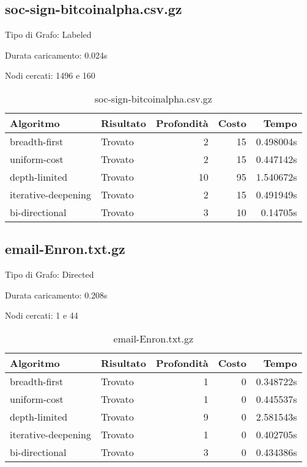 \subsection{soc-sign-bitcoinalpha.csv.gz}
Tipo di Grafo: Labeled

Durata caricamento: 0.024s

Nodi cercati: 1496 e 160

\begin{table}[h]
	\centering
	\begin{tabular}{|l|l|r|r|r|}
		\hline
		\textbf{Algoritmo}  & \textbf{Risultato} & \textbf{Profondità} & \textbf{Costo} & \textbf{Tempo} \\
		\hline
		breadth-first       & Trovato            & 2                   & 15             & 0.498004s      \\
		uniform-cost        & Trovato            & 2                   & 15             & 0.447142s      \\
		depth-limited       & Trovato            & 10                  & 95             & 1.540672s      \\
		iterative-deepening & Trovato            & 2                   & 15             & 0.491949s      \\
		bi-directional      & Trovato            & 3                   & 10             & 0.14705s       \\
		\hline
	\end{tabular}
	\caption{soc-sign-bitcoinalpha.csv.gz}
\end{table}
\subsection{email-Enron.txt.gz}
Tipo di Grafo: Directed

Durata caricamento: 0.208s

Nodi cercati: 1 e 44

\begin{table}[h]
	\centering
	\begin{tabular}{|l|l|r|r|r|}
		\hline
		\textbf{Algoritmo}  & \textbf{Risultato} & \textbf{Profondità} & \textbf{Costo} & \textbf{Tempo} \\
		\hline
		breadth-first       & Trovato            & 1                   & 0              & 0.348722s      \\
		uniform-cost        & Trovato            & 1                   & 0              & 0.445537s      \\
		depth-limited       & Trovato            & 9                   & 0              & 2.581543s      \\
		iterative-deepening & Trovato            & 1                   & 0              & 0.402705s      \\
		bi-directional      & Trovato            & 3                   & 0              & 0.434386s      \\
		\hline
	\end{tabular}
	\caption{email-Enron.txt.gz}
\end{table}
